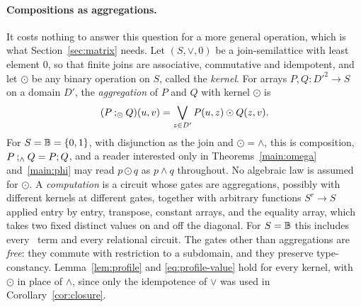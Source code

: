\paragraph{Compositions as aggregations.}
It costs nothing to answer this question for a more general operation,
which is what Section~\ref{sec:matrix} needs. Let $(S,\vee,0)$ be a join-semilattice with
least element $0$, so that finite joins are associative, commutative and
idempotent, and let $\odot$ be any binary operation on $S$, called the
\emph{kernel}. For arrays $P,Q:D'^2\to S$ on a domain $D'$, the
\emph{aggregation} of $P$ and $Q$ with kernel $\odot$ is
\begin{equation}\label{eq:aggregation}
 (P\mathbin{;_{\odot}} Q)(u,v)=\bigvee_{z\in D'}P(u,z)\odot Q(z,v).
\end{equation}
For $S=\mathbb B=\{0,1\}$, with disjunction as the join and $\odot=\land$, this
is composition,
$P\mathbin{;_{\land}} Q=P;Q$, and a reader interested only in
Theorems~\ref{main:omega} and~\ref{main:phi} may read $p\odot q$ as
$p\land q$ throughout. No algebraic law is assumed for $\odot$. A
\emph{computation} is a circuit whose gates are aggregations, possibly with
different kernels at different gates, together with arbitrary functions
$S^r\to S$ applied entry by entry, transpose, constant arrays, and the
equality array, which takes two fixed distinct values on and off the
diagonal. For $S=\mathbb B$ this includes every \CoR\ term and every relational
circuit. The gates other than aggregations are \emph{free}: they commute
with restriction to a subdomain, and they preserve type-constancy.
Lemma~\ref{lem:profile} and \eqref{eq:profile-value} hold for every kernel,
with $\odot$ in place of $\land$, since only the idempotence of $\vee$ was
used in Corollary~\ref{cor:closure}.

